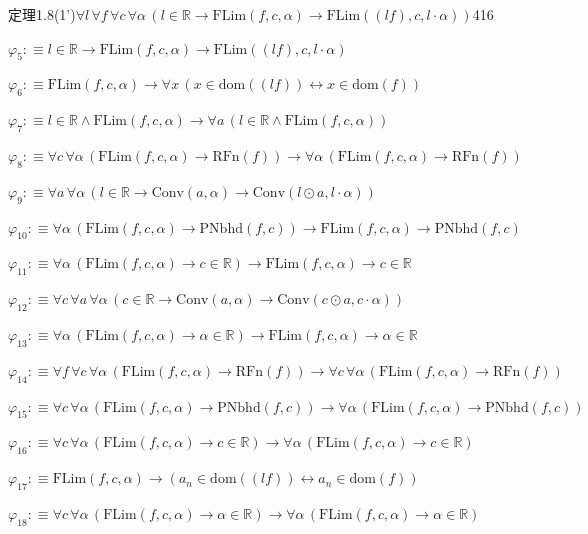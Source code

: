 \begin{fullproof}{定理1.8(1')}{$\forall l\,\forall f\,\forall c\,\forall \alpha\,(l \in \mathbb{R} \to \mathrm{FLim}(f,c,\alpha) \to \mathrm{FLim}((l f),c,l \cdot \alpha))$}{416}
\begin{abbrevlist}
\item $\varphi_{5} :\equiv l \in \mathbb{R} \to \mathrm{FLim}(f,c,\alpha) \to \mathrm{FLim}((l f),c,l \cdot \alpha)$
\item $\varphi_{6} :\equiv \mathrm{FLim}(f,c,\alpha) \to \forall x\,(x \in \mathrm{dom}((l f)) \leftrightarrow x \in \mathrm{dom}(f))$
\item $\varphi_{7} :\equiv l \in \mathbb{R} \land \mathrm{FLim}(f,c,\alpha) \to \forall a\,(l \in \mathbb{R} \land \mathrm{FLim}(f,c,\alpha))$
\item $\varphi_{8} :\equiv \forall c\,\forall \alpha\,(\mathrm{FLim}(f,c,\alpha) \to \mathrm{RFn}(f)) \to \forall \alpha\,(\mathrm{FLim}(f,c,\alpha) \to \mathrm{RFn}(f))$
\item $\varphi_{9} :\equiv \forall a\,\forall \alpha\,(l \in \mathbb{R} \to \mathrm{Conv}(a,\alpha) \to \mathrm{Conv}(l \odot a,l \cdot \alpha))$
\item $\varphi_{10} :\equiv \forall \alpha\,(\mathrm{FLim}(f,c,\alpha) \to \mathrm{PNbhd}(f,c)) \to \mathrm{FLim}(f,c,\alpha) \to \mathrm{PNbhd}(f,c)$
\item $\varphi_{11} :\equiv \forall \alpha\,(\mathrm{FLim}(f,c,\alpha) \to c \in \mathbb{R}) \to \mathrm{FLim}(f,c,\alpha) \to c \in \mathbb{R}$
\item $\varphi_{12} :\equiv \forall c\,\forall a\,\forall \alpha\,(c \in \mathbb{R} \to \mathrm{Conv}(a,\alpha) \to \mathrm{Conv}(c \odot a,c \cdot \alpha))$
\item $\varphi_{13} :\equiv \forall \alpha\,(\mathrm{FLim}(f,c,\alpha) \to \alpha \in \mathbb{R}) \to \mathrm{FLim}(f,c,\alpha) \to \alpha \in \mathbb{R}$
\item $\varphi_{14} :\equiv \forall f\,\forall c\,\forall \alpha\,(\mathrm{FLim}(f,c,\alpha) \to \mathrm{RFn}(f)) \to \forall c\,\forall \alpha\,(\mathrm{FLim}(f,c,\alpha) \to \mathrm{RFn}(f))$
\item $\varphi_{15} :\equiv \forall c\,\forall \alpha\,(\mathrm{FLim}(f,c,\alpha) \to \mathrm{PNbhd}(f,c)) \to \forall \alpha\,(\mathrm{FLim}(f,c,\alpha) \to \mathrm{PNbhd}(f,c))$
\item $\varphi_{16} :\equiv \forall c\,\forall \alpha\,(\mathrm{FLim}(f,c,\alpha) \to c \in \mathbb{R}) \to \forall \alpha\,(\mathrm{FLim}(f,c,\alpha) \to c \in \mathbb{R})$
\item $\varphi_{17} :\equiv \mathrm{FLim}(f,c,\alpha) \to (a_{n} \in \mathrm{dom}((l f)) \leftrightarrow a_{n} \in \mathrm{dom}(f))$
\item $\varphi_{18} :\equiv \forall c\,\forall \alpha\,(\mathrm{FLim}(f,c,\alpha) \to \alpha \in \mathbb{R}) \to \forall \alpha\,(\mathrm{FLim}(f,c,\alpha) \to \alpha \in \mathbb{R})$

\end{abbrevlist}
\end{fullproof}
